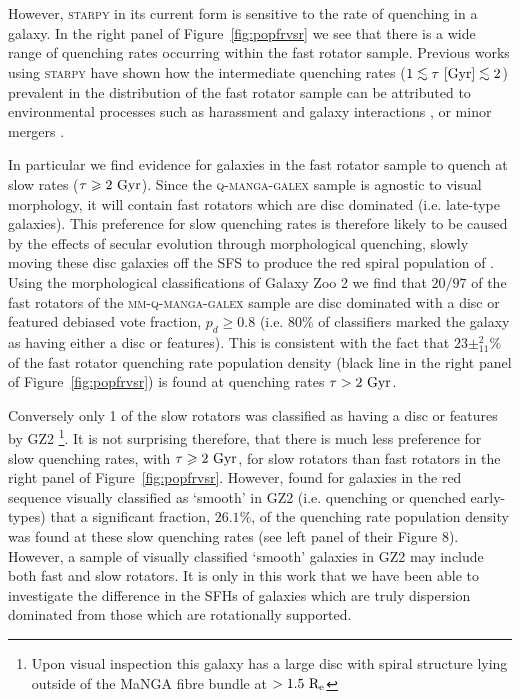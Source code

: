 \documentclass[useAMS,usenatbib]{mn2e}
\def\lesssim{\mathrel{\hbox{\rlap{\hbox{\lower3pt\hbox{$\sim$}}}\hbox{\raise2pt\hbox{$<$}}}}}
\begin{document}
However, \textsc{starpy} in its current form is sensitive to the rate of quenching in a galaxy. In the right panel of Figure~\ref{fig:popfrvsr} we see that there is a wide range of quenching rates occurring within the fast rotator sample. Previous works using \textsc{starpy} have shown how the intermediate quenching rates ($1 \lesssim \tau~[\rm{Gyr}]\lesssim 2$) prevalent in the distribution of the fast rotator sample can be attributed to environmental processes such as harassment and galaxy interactions \citep{smethurst17}, or minor mergers \citep{smethurst15}.  

In particular we find evidence for galaxies in the fast rotator sample to quench at slow rates ($\tau \geq 2~\rm{Gyr}$). Since the \textsc{q-manga-galex} sample is agnostic to visual morphology, it will contain fast rotators which are disc dominated (i.e. late-type galaxies). This preference for slow quenching rates is therefore likely to be caused by the effects of secular evolution through morphological quenching, slowly moving these disc galaxies off the SFS to produce the red spiral population of \cite{masters12a}. Using the morphological classifications of Galaxy Zoo 2 \citep[GZ2][]{lintott11, GZ2} we find that $20/97$ of the fast rotators of the \textsc{mm-q-manga-galex} sample are disc dominated with a disc or featured debiased vote fraction, $p_d \geq 0.8$ (i.e. $80\%$ of classifiers marked the galaxy as having either a disc or features). This is consistent with the fact that $23\pm^{2}_{11}\%$ of the fast rotator quenching rate population density (black line in the right panel of Figure~\ref{fig:popfrvsr}) is found at quenching rates $\tau > 2~\rm{Gyr}$. 

Conversely only 1 of the slow rotators was classified as having a disc or features by GZ2 \footnote{Upon visual inspection this galaxy has a large disc with spiral structure lying outside of the MaNGA fibre bundle at $>1.5~\rm{R_e}$}. It is not surprising therefore, that there is much less preference for slow quenching rates, with $\tau \geq 2~\rm{Gyr}$, for slow rotators than fast rotators in the right panel of Figure~\ref{fig:popfrvsr}. However, \cite{smethurst15} found for galaxies in the red sequence visually classified as `smooth' in GZ2 (i.e. quenching or quenched early-types) that a significant fraction, $26.1\%$, of the quenching rate population density was found at these slow quenching rates (see left panel of their Figure 8). However, a sample of  visually classified `smooth' galaxies in GZ2 may include both fast and slow rotators. It is only in this work that we have been able to investigate the difference in the SFHs of galaxies which are truly dispersion dominated from those which are rotationally supported.
\end{document}
